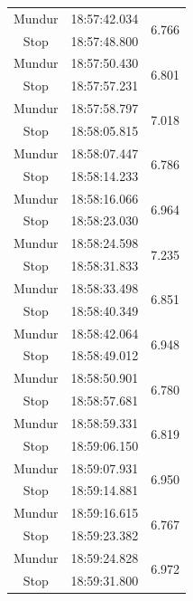 \begin{longtable}{|c|c|c|}
  Mundur & 18:57:42.034 & \multirow{2}{*}{6.766} \\ \cline{1-2}
  Stop   & 18:57:48.800 &                        \\ \hline
  Mundur & 18:57:50.430 & \multirow{2}{*}{6.801} \\ \cline{1-2}
  Stop   & 18:57:57.231 &                        \\ \hline
  Mundur & 18:57:58.797 & \multirow{2}{*}{7.018} \\ \cline{1-2}
  Stop   & 18:58:05.815 &                        \\ \hline
  Mundur & 18:58:07.447 & \multirow{2}{*}{6.786} \\ \cline{1-2}
  Stop   & 18:58:14.233 &                        \\ \hline
  Mundur & 18:58:16.066 & \multirow{2}{*}{6.964} \\ \cline{1-2}
  Stop   & 18:58:23.030 &                        \\ \hline
  Mundur & 18:58:24.598 & \multirow{2}{*}{7.235} \\ \cline{1-2}
  Stop   & 18:58:31.833 &                        \\ \hline
  Mundur & 18:58:33.498 & \multirow{2}{*}{6.851} \\ \cline{1-2}
  Stop   & 18:58:40.349 &                        \\ \hline
  Mundur & 18:58:42.064 & \multirow{2}{*}{6.948} \\ \cline{1-2}
  Stop   & 18:58:49.012 &                        \\ \hline
  Mundur & 18:58:50.901 & \multirow{2}{*}{6.780} \\ \cline{1-2}
  Stop   & 18:58:57.681 &                        \\ \hline
  Mundur & 18:58:59.331 & \multirow{2}{*}{6.819} \\ \cline{1-2}
  Stop   & 18:59:06.150 &                        \\ \hline
  Mundur & 18:59:07.931 & \multirow{2}{*}{6.950} \\ \cline{1-2}
  Stop   & 18:59:14.881 &                        \\ \hline
  Mundur & 18:59:16.615 & \multirow{2}{*}{6.767} \\ \cline{1-2}
  Stop   & 18:59:23.382 &                        \\ \hline
  Mundur & 18:59:24.828 & \multirow{2}{*}{6.972} \\ \cline{1-2}
  Stop   & 18:59:31.800 &                        \\ \hline

\end{longtable}
